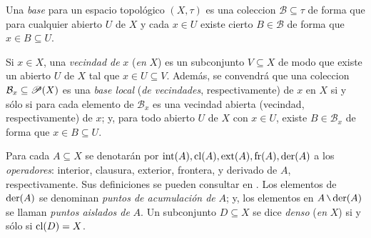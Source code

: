     Una \textit{base} para un espacio topológico $(X,\tau)$ es una coleccion $\mathcal{B} \subseteq \tau$ de forma que para cualquier abierto $U$ de $X$ y cada $x \in U$ existe cierto $B \in \mathcal{B}$ de forma que $x \in B \subseteq U$. 


    
    Si $x \in X$, una \textit{vecindad de} $x$ (\textit{en} $X$) es un subconjunto $V \subseteq X$ de modo que existe un abierto $U$ de $X$ tal que $x \in U \subseteq V$. Además, se convendrá que una coleccion $\mathcal{B}_x \subseteq \mathscr{P}(X)$ es una \textit{base local} (\textit{de vecindades}, respectivamente) de $x$ en $X$ si y sólo si para cada elemento de $\mathcal{B}_x$ es una vecindad abierta (vecindad, respectivamente) de $x$; y, para todo abierto $U$ de $X$ con $x \in U$, existe $B \in \mathcal{B}_x$ de forma que $x \in B \subseteq U$.

    Para cada $A \subseteq X$ se denotarán por $\operatorname{int}(A),\operatorname{cl}(A),\operatorname{ext}(A),\operatorname{fr}(A),\operatorname{der}(A)$ a los \textit{operadores}: interior, clausura, exterior, frontera, y derivado de $A$, respectivamente. Sus definiciones se pueden consultar en \cite[Cap.~2]{fidelElementos}. Los elementos de $\operatorname{der}(A)$ se denominan \textit{puntos de acumulación de} $A$; y, los elementos en $A \setminus \der(A)$ se llaman \textit{puntos aislados de} $A$. Un subconjunto $D \subseteq X$ se dice \textit{denso} (\textit{en} $X$) si y sólo si $\operatorname{cl}(D)=X$.

